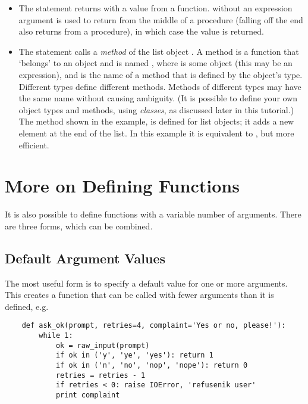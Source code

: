 \begin{itemize}

\item
The  statement returns with a value from a function.
 without an expression argument is used to return from
the middle of a procedure (falling off the end also returns from a
procedure), in which case the  value is returned.

\item
The statement  calls a \emph{method} of the list
object .  A method is a function that `belongs' to an
object and is named , where  is some
object (this may be an expression), and  is the name
of a method that is defined by the object's type.  Different types
define different methods.  Methods of different types may have the
same name without causing ambiguity.  (It is possible to define your
own object types and methods, using \emph{classes}, as discussed later
in this tutorial.)
The method  shown in the example, is defined for
list objects; it adds a new element at the end of the list.  In this
example
it is equivalent to , but more efficient.

\end{itemize}

\section{More on Defining Functions}

It is also possible to define functions with a variable number of
arguments.  There are three forms, which can be combined.

\subsection{Default Argument Values}

The most useful form is to specify a default value for one or more
arguments.  This creates a function that can be called with fewer
arguments than it is defined, e.g.

\begin{verbatim}
    def ask_ok(prompt, retries=4, complaint='Yes or no, please!'):
        while 1:
            ok = raw_input(prompt)
            if ok in ('y', 'ye', 'yes'): return 1
            if ok in ('n', 'no', 'nop', 'nope'): return 0
            retries = retries - 1
            if retries < 0: raise IOError, 'refusenik user'
            print complaint
\end{verbatim}


